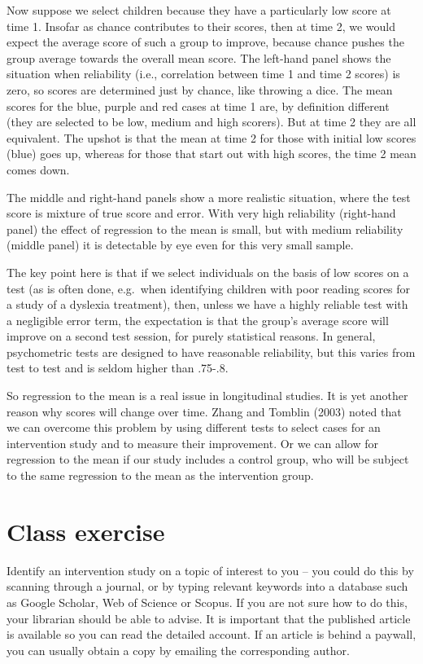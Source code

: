 \documentclass[]{book}
\begin{document}
Now suppose we select children because they have a particularly low score at time 1. Insofar as chance contributes to their scores, then at time 2, we would expect the average score of such a group to improve, because chance pushes the group average towards the overall mean score. The left-hand panel shows the situation when reliability (i.e., correlation between time 1 and time 2 scores) is zero, so scores are determined just by chance, like throwing a dice. The mean scores for the blue, purple and red cases at time 1 are, by definition different (they are selected to be low, medium and high scorers). But at time 2 they are all equivalent. The upshot is that the mean at time 2 for those with initial low scores (blue) goes up, whereas for those that start out with high scores, the time 2 mean comes down.

The middle and right-hand panels show a more realistic situation, where the test score is mixture of true score and error. With very high reliability (right-hand panel) the effect of regression to the mean is small, but with medium reliability (middle panel) it is detectable by eye even for this very small sample.

The key point here is that if we select individuals on the basis of low scores on a test (as is often done, e.g.~when identifying children with poor reading scores for a study of a dyslexia treatment), then, unless we have a highly reliable test with a negligible error term, the expectation is that the group's average score will improve on a second test session, for purely statistical reasons. In general, psychometric tests are designed to have reasonable reliability, but this varies from test to test and is seldom higher than .75-.8.

So regression to the mean is a real issue in longitudinal studies. It is yet another reason why scores will change over time. Zhang and Tomblin (2003) noted that we can overcome this problem by using different tests to select cases for an intervention study and to measure their improvement. Or we can allow for regression to the mean if our study includes a control group, who will be subject to the same regression to the mean as the intervention group.

\hypertarget{class-exercise-1}{%
\section{Class exercise}\label{class-exercise-1}}

Identify an intervention study on a topic of interest to you -- you could do this by scanning through a journal, or by typing relevant keywords into a database such as Google Scholar, Web of Science or Scopus. If you are not sure how to do this, your librarian should be able to advise. It is important that the published article is available so you can read the detailed account. If an article is behind a paywall, you can usually obtain a copy by emailing the corresponding author.
\end{document}
